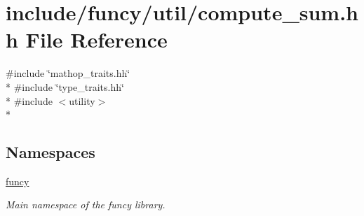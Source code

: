 \hypertarget{compute__sum_8hh}{\section{include/funcy/util/compute\-\_\-sum.hh File Reference}
\label{compute__sum_8hh}
}
{\ttfamily \#include \char`\"{}mathop\-\_\-traits.\-hh\char`\"{}}\\*
{\ttfamily \#include \char`\"{}type\-\_\-traits.\-hh\char`\"{}}\\*
{\ttfamily \#include $<$utility$>$}\\*
\subsection*{Namespaces}
\begin{DoxyCompactItemize}
\item 
\hyperlink{namespacefuncy}{funcy}
\begin{DoxyCompactList}\small\item\em Main namespace of the funcy library. \end{DoxyCompactList}\end{DoxyCompactItemize}
